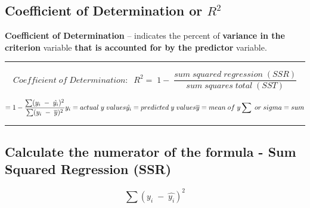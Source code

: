 \documentclass[
]{book}
\newenvironment{Shaded}{\begin{snugshade}}{\end{snugshade}}
\newcommand{\DecValTok}[1]{\textcolor[rgb]{0.00,0.00,0.81}{#1}}
\newcommand{\FunctionTok}[1]{\textcolor[rgb]{0.13,0.29,0.53}{\textbf{#1}}}
\newcommand{\NormalTok}[1]{#1}
\newcommand{\OtherTok}[1]{\textcolor[rgb]{0.56,0.35,0.01}{#1}}
\newcommand{\SpecialCharTok}[1]{\textcolor[rgb]{0.81,0.36,0.00}{\textbf{#1}}}
\theoremstyle{definition}
\theoremstyle{definition}
\theoremstyle{definition}
\theoremstyle{definition}
\theoremstyle{remark}
\begin{document}
\hypertarget{coefficient-of-determination-or-r2}{%
\subsection{\texorpdfstring{Coefficient of Determination or \({R^2}\)}{Coefficient of Determination or \{R\^{}2\}}}\label{coefficient-of-determination-or-r2}}

\textbf{Coefficient of Determination} -- indicates the percent of \textbf{variance in the criterion} variable \textbf{that is accounted for by the predictor} variable.

\begin{center}\rule{0.5\linewidth}{0.5pt}\end{center}

\[
Coefficient\;of\;Determination:\;\;R^2 =\;1-\; \frac{sum\;squared\;regression\;(SSR)}{sum\;squares\;total\;(SST)}
\]

\[
=1- \frac{\sum(y_{i}\;-\;\hat{y_{i}})^2}{\sum(y_{i}\;-\;\overline{y})^2}
\\
\\
y_{i} = actual\;y\;values
\\
\hat{y_i} = predicted\;y\;values
\\
\overline{y} = mean\;of\;y
\\
\sum\;or\;sigma = sum
\]

\begin{center}\rule{0.5\linewidth}{0.5pt}\end{center}

\hypertarget{calculate-the-numerator-of-the-formula---sum-squared-regression-ssr}{%
\subsection{Calculate the numerator of the formula - Sum Squared Regression (SSR)}\label{calculate-the-numerator-of-the-formula---sum-squared-regression-ssr}}

\[
\sum(y_{i}\;-\;\hat{y_{i}})^2
\]

\begin{Shaded}
\end{Shaded}
\end{document}

